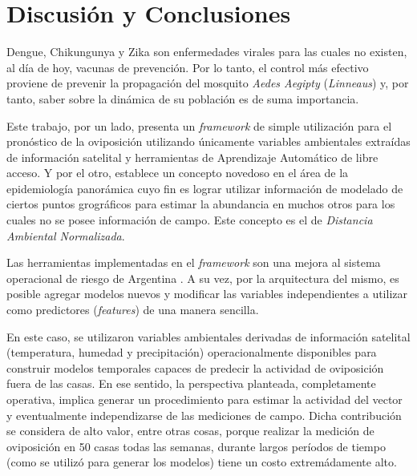 %
%
%

\justifying

\chapter{Discusión y Conclusiones}

  \par Dengue, Chikungunya y Zika son enfermedades virales para las cuales no
    existen, al día de hoy, vacunas de prevención. Por lo tanto, el control
    más efectivo proviene de prevenir la propagación del mosquito
    \textit{Aedes Aegipty} (\textit{Linneaus}) y, por tanto, saber sobre la
    dinámica de su población es de suma importancia.

  \par Este trabajo, por un lado, presenta un \textit{framework} de simple
    utilización para el
    pronóstico de la oviposición utilizando
    únicamente variables ambientales extraídas de información satelital y
    herramientas de Aprendizaje Automático de libre acceso. Y por el otro,
    establece un concepto novedoso en el área de la epidemiología panorámica
    cuyo fin es lograr utilizar información de modelado de ciertos puntos grográficos
    para estimar la abundancia en muchos otros para los cuales no se posee
    información de campo. Este concepto es el de \textit{Distancia Ambiental Normalizada}.

  \par Las herramientas implementadas en el \textit{framework}
    son una mejora al sistema operacional de riesgo de
    Argentina \cite{porcasi_operative}. A su vez, por la arquitectura del mismo,
    es posible agregar modelos nuevos y modificar las variables independientes a utilizar como
    predictores (\textit{features}) de una manera sencilla.

  \par En este caso, se utilizaron variables ambientales derivadas de información satelital
    (temperatura, humedad y precipitación) operacionalmente disponibles para
    construir modelos temporales capaces de predecir la actividad de oviposición
    fuera de las casas. En ese sentido, la perspectiva planteada, completamente operativa,
    implica generar un procedimiento para estimar la actividad del vector
    y eventualmente independizarse de las mediciones de campo. Dicha contribución
    se considera de alto valor, entre otras cosas, porque realizar la medición
    de oviposición en 50 casas todas las semanas, durante
    largos períodos de tiempo (como se utilizó para generar los modelos) tiene
    un costo extremádamente alto.

